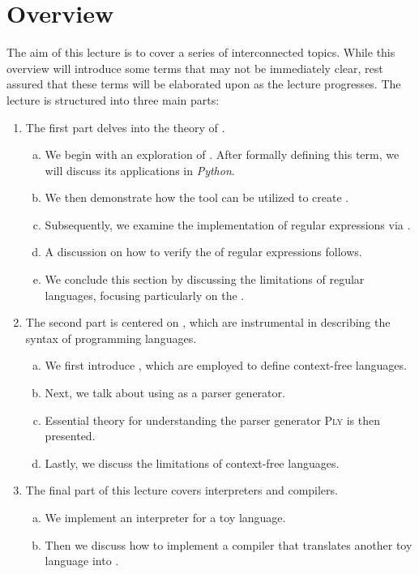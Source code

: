 \section{Overview}
The aim of this lecture is to cover a series of interconnected topics.
While this overview will introduce some terms that may not be immediately clear, rest assured that these terms will
be elaborated upon as the lecture progresses.
The lecture is structured into three main parts: 

\begin{enumerate}
\item The first part delves into the theory of .
  \begin{enumerate}[(a)]
  \item We begin with an exploration of . After formally defining this term, we will discuss its applications in \textsl{Python}.
  \item We then demonstrate how the  tool can be utilized to create .
  \item Subsequently, we examine the implementation of regular expressions via .
  \item A discussion on how to verify the  of regular expressions follows.
  \item We conclude this section by discussing the limitations of regular languages, focusing particularly on the .
  \end{enumerate}
  
\item The second part is centered on , which are instrumental in describing the syntax of programming languages.
  \begin{enumerate}[(a)]
  \item We first introduce , which are employed to define context-free languages.
  \item Next, we talk about using  as a parser generator.
  \item Essential theory for understanding the parser generator \textsc{Ply} is then presented.
  \item Lastly, we discuss the limitations of context-free languages.
  \end{enumerate}

\item The final part of this lecture covers interpreters and compilers.
  \begin{enumerate}[(a)]
  \item We implement an interpreter for a toy language.
  \item Then we discuss how to implement a compiler that translates another toy language into .
  \end{enumerate}
\end{enumerate}

